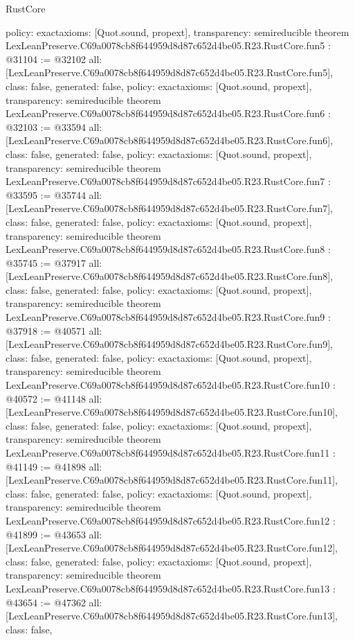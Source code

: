 \begin{lexlean}{RustCore}
\begin{coremodule}
{  policy: exact{axioms: [Quot.sound, propext]},
  transparency: semireducible
}
theorem LexLeanPreserve.C69a0078cb8f644959d8d87c652d4be05.R23.RustCore.fun5 : @31104 := @32102 {
  all: [LexLeanPreserve.C69a0078cb8f644959d8d87c652d4be05.R23.RustCore.fun5],
  class: false,
  generated: false,
  policy: exact{axioms: [Quot.sound, propext]},
  transparency: semireducible
}
theorem LexLeanPreserve.C69a0078cb8f644959d8d87c652d4be05.R23.RustCore.fun6 : @32103 := @33594 {
  all: [LexLeanPreserve.C69a0078cb8f644959d8d87c652d4be05.R23.RustCore.fun6],
  class: false,
  generated: false,
  policy: exact{axioms: [Quot.sound, propext]},
  transparency: semireducible
}
theorem LexLeanPreserve.C69a0078cb8f644959d8d87c652d4be05.R23.RustCore.fun7 : @33595 := @35744 {
  all: [LexLeanPreserve.C69a0078cb8f644959d8d87c652d4be05.R23.RustCore.fun7],
  class: false,
  generated: false,
  policy: exact{axioms: [Quot.sound, propext]},
  transparency: semireducible
}
theorem LexLeanPreserve.C69a0078cb8f644959d8d87c652d4be05.R23.RustCore.fun8 : @35745 := @37917 {
  all: [LexLeanPreserve.C69a0078cb8f644959d8d87c652d4be05.R23.RustCore.fun8],
  class: false,
  generated: false,
  policy: exact{axioms: [Quot.sound, propext]},
  transparency: semireducible
}
theorem LexLeanPreserve.C69a0078cb8f644959d8d87c652d4be05.R23.RustCore.fun9 : @37918 := @40571 {
  all: [LexLeanPreserve.C69a0078cb8f644959d8d87c652d4be05.R23.RustCore.fun9],
  class: false,
  generated: false,
  policy: exact{axioms: [Quot.sound, propext]},
  transparency: semireducible
}
theorem LexLeanPreserve.C69a0078cb8f644959d8d87c652d4be05.R23.RustCore.fun10 : @40572 := @41148 {
  all: [LexLeanPreserve.C69a0078cb8f644959d8d87c652d4be05.R23.RustCore.fun10],
  class: false,
  generated: false,
  policy: exact{axioms: [Quot.sound, propext]},
  transparency: semireducible
}
theorem LexLeanPreserve.C69a0078cb8f644959d8d87c652d4be05.R23.RustCore.fun11 : @41149 := @41898 {
  all: [LexLeanPreserve.C69a0078cb8f644959d8d87c652d4be05.R23.RustCore.fun11],
  class: false,
  generated: false,
  policy: exact{axioms: [Quot.sound, propext]},
  transparency: semireducible
}
theorem LexLeanPreserve.C69a0078cb8f644959d8d87c652d4be05.R23.RustCore.fun12 : @41899 := @43653 {
  all: [LexLeanPreserve.C69a0078cb8f644959d8d87c652d4be05.R23.RustCore.fun12],
  class: false,
  generated: false,
  policy: exact{axioms: [Quot.sound, propext]},
  transparency: semireducible
}
theorem LexLeanPreserve.C69a0078cb8f644959d8d87c652d4be05.R23.RustCore.fun13 : @43654 := @47362 {
  all: [LexLeanPreserve.C69a0078cb8f644959d8d87c652d4be05.R23.RustCore.fun13],
  class: false,
}
\end{coremodule}
\end{lexlean}
